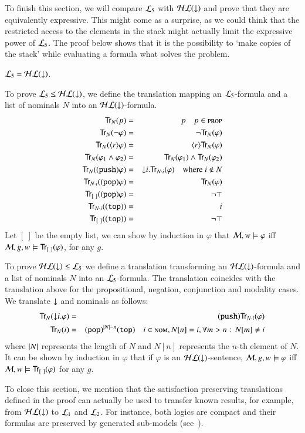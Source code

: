 To finish this section, we will compare $\mathcal{L}_5$ with $\mathcal{HL}({\downarrow})$ and
prove that they are equivalently expressive.  This might come as a
surprise, as we could think that the restricted access to the elements
in the stack might actually limit the expressive power of $\mathcal{L}_5$.
The proof below shows that it is the possibility to `make copies of
the stack' while evaluating a formula what solves the problem.

\begin{thm}\label{prop:stack_leq_hl}
$\mathcal{L}_5 = \mathcal{HL}({\downarrow})$.
\end{thm}

\begin{pf}
To prove $\mathcal{L}_5 \le \mathcal{HL}({\downarrow})$, we define
the translation mapping an $\mathcal{L}_5$-formula and a list of
nominals $N$ into an $\mathcal{HL}({\downarrow})$-formula.
\begin{eqnarray*}
{\sf Tr}_N(p) & = & p \quad p \in \textsc{prop}\\
{\sf Tr}_N(\lnot \varphi) & = & \lnot {\sf Tr}_N(\varphi) \\
{\sf Tr}_N(\langle r \rangle \varphi) & = & \langle r \rangle {\sf Tr}_N(\varphi) \\
{\sf Tr}_N(\varphi_1 \land \varphi_2) & = & {\sf Tr}_N(\varphi_1) \land {\sf Tr}_N(\varphi_2)\\
{\sf Tr}_N({\tt (push)} \varphi) & = & {\downarrow} i. {\sf Tr}_{N\cdot i}(\varphi) \quad
\textrm{where $i \notin N$}\\
{\sf Tr}_{N\cdot i}({\tt (pop)} \varphi) & = & {\sf Tr}_{N}(\varphi)\\
{\sf Tr}_{[\ ]}({\tt (pop)} \varphi) & = & \lnot\top\\
{\sf Tr}_{N\cdot i}({\tt (top)}) & = & i\\
{\sf Tr}_{[\ ]}({\tt (top)}) & = & \lnot\top
\end{eqnarray*}
Let $[\ ]$ be the empty list, we can show
by induction in $\varphi$ that $\mathcal{M}, w \models
\varphi$ iff $\mathcal{M}, g, w \models {\sf Tr}_{[\ ]}(\varphi)$, for any $g$.
\smallskip

To prove $\mathcal{HL}({\downarrow}) \le \mathcal{L}_5$ we define a translation transforming an
$\mathcal{HL}({\downarrow})$-formula and a list of nominals $N$ into an
$\mathcal{L}_5$-formula. The translation coincides with the translation
above for the propositional, negation, conjunction and modality
cases. We translate ${\downarrow}$ and nominals as follows:
\begin{eqnarray*}
{\sf Tr}_N({\downarrow} i.\varphi) & = & {\tt (push)}{\sf Tr}_{N\cdot i}(\varphi)\\
{\sf Tr}_N(i) & = & {\tt (pop)}^{|N|-n}{\tt (top)} \quad i \in \textsc{nom}, N[n]=i,
\forall m>n:\, N[m]\not=i
\end{eqnarray*}
where $|N|$ represents the length of $N$ and $N[n]$ represents
the $n$-th element of $N$. It can be shown by induction in $\varphi$
that if $\varphi$ is an $\mathcal{HL}({\downarrow})$-sentence, $\mathcal{M}, g, w \models
\varphi$ iff $\model, w \models \Tr_{[\ ]}(\varphi)$ for any $g$.
\end{pf}

To close this section, we mention that the satisfaction preserving
translations defined in the proof can actually be used to transfer
known results, for example, from  $\mathcal{HL}({\downarrow})$ to $\mathcal{L}_1$ and
$\mathcal{L}_2$.  For instance, both logics are compact and their formulas
are preserved by generated sub-models (see~\cite{areces01:_hybrid}).
